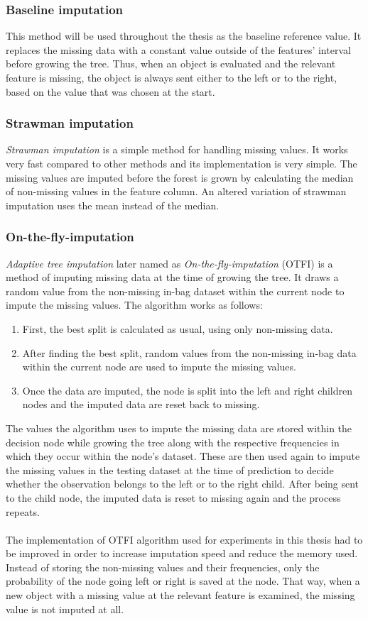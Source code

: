 \documentclass[11pt]{article}
\begin{document}
      \subsubsection{Baseline imputation}
        This method will be used throughout the thesis as the baseline reference value. It replaces the missing data with a constant value outside of the features' interval before growing the tree. Thus, when an object is evaluated and the relevant feature is missing, the object is always sent either to the left or to the right, based on the value that was chosen at the start.
      \subsubsection{Strawman imputation}
        {\it Strawman imputation}\cite{otfi} is a simple method for handling missing values. It works very fast compared to other methods and its implementation is very simple. The missing values are imputed before the forest is grown by calculating the median of non-missing values in the feature column. An altered variation of strawman imputation uses the mean instead of the median.
      \subsubsection{On-the-fly-imputation}
        {\it Adaptive tree imputation}\cite{rsf} later named as {\it On-the-fly-imputation}\cite{otfi} (OTFI) is a method of imputing missing data at the time of growing the tree. It draws a random value from the non-missing in-bag dataset within the current node to impute the missing values. The algorithm works as follows: 
        \begin{enumerate}
        \item First, the best split is calculated as usual, using only non-missing data.
        \item After finding the best split, random values from the non-missing in-bag data within the current node are used to impute the missing values.
        \item Once the data are imputed, the node is split into the left and right children nodes and the imputed data are reset back to missing.
        \end{enumerate}
        The values the algorithm uses to impute the missing data are stored within the decision node while growing the tree along with the respective frequencies in which they occur within the node's dataset. These are then used again to impute the missing values in the testing dataset at the time of prediction to decide whether the observation belongs to the left or to the right child. After being sent to the child node, the imputed data is reset to missing again and the process repeats.
        \\~\\
        The implementation of OTFI algorithm used for experiments in this thesis had to be improved in order to increase imputation speed and reduce the memory used. Instead of storing the non-missing values and their frequencies, only the probability of the node going left or right is saved at the node. That way, when a new object with a missing value at the relevant feature is examined, the missing value is not imputed at all.
\end{document}
